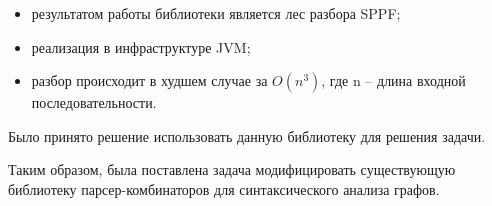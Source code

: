 \begin{itemize} 
\item результатом работы библиотеки является лес разбора SPPF;
\item реализация в инфраструктуре JVM;
\item разбор происходит в худшем случае за $O(n^3)$, где n – длина входной последовательности.
\end{itemize}

Было принято решение использовать данную библиотеку для решения задачи.

Таким образом, была поставлена задача модифицировать существующую библиотеку парсер-комбинаторов для синтаксического анализа графов.
